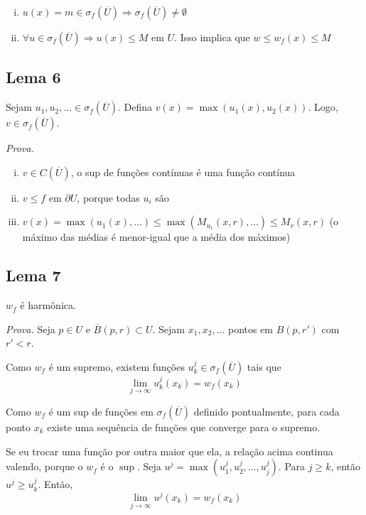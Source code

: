 \documentclass[11pt]{article}
\newcommand{\p}{\partial}
\begin{document}
\begin{enumerate}[(i)]
	\item \(u(x) = m \in \sigma_f(\overline{U}) \Rightarrow  \sigma_f(\overline{U})\neq \emptyset\)
	\item \(\forall u \in \sigma_f(\overline{U}) \Rightarrow u(x) \leq M \text{ em } U\). Isso implica que \(w \leq w_f(x) \leq M\)
\end{enumerate}

\subsection*{Lema 6}

Sejam \(u_1, u_2, \ldots \in \sigma_f(\overline{U})\). Defina \(v(x) = \max(u_1(x), u_2(x))\). Logo, \(v \in \sigma_f(\overline{U})\).

\textit{Prova.}
 
\begin{enumerate}[(i)]
	\item \(v \in C(\overline{U})\), o sup de funções contínuas é uma função contínua
	\item \(v \leq f\) em \(\p U\), porque todas \(u_i\) são
	\item \(v(x) = \max(u_1(x), \ldots) \leq \max(M_{u_1}(x,r), \ldots ) \leq M_v(x,r)\) (o máximo das médias é menor-igual que a média dos máximos)
\end{enumerate}

\subsection*{Lema 7}
\(w_f\) é harmônica.

\textit{Prova.} Seja \(p \in U\) e \(\overline{B}(p,r) \subset U\). Sejam \(x_1, x_2, \ldots\) pontos em \(B(p, r')\) com \(r'<r\).

Como \(w_f\) é um supremo, existem funções \(u^j_k \in \sigma_f(\overline{U})\) tais que \[\lim_{j \rightarrow \infty} u^j_k (x_k) = w_f(x_k)\]

Como \(w_f\) é um sup de funções em \( \sigma_f(\overline{U}) \) definido pontualmente, para cada ponto \(x_k\) existe uma sequência de funções que converge para o supremo.

Se eu trocar uma função por outra maior que ela, a relação acima continua valendo, porque o \(w_f\) é o \(\sup\).
Seja \(u^j = \max (u^j_1, u^j_2, \ldots, u^j_j)\). Para \(j\geq k\), então \(u^j \geq u^j_k\). Então, \[\lim_{j \rightarrow \infty} u^j (x_k) = w_f(x_k)\]
\end{document}
